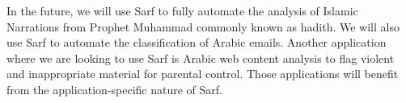 \documentclass[11pt]{article}
\begin{document}
In the future, we will use Sarf to fully automate the analysis of Islamic Narrations 
from Prophet Muhammad commonly known as hadith.
We will also use Sarf to automate the classification of
Arabic emails. Another application where we are looking to use Sarf is
Arabic web content analysis to flag violent and inappropriate material for parental control.
Those applications will benefit from the application-specific nature of Sarf.










%

{\small }
\end{document}
